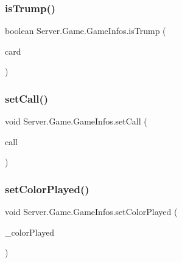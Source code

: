 \subsubsection{\texorpdfstring{is\+Trump()}{isTrump()}}
{\footnotesize\ttfamily boolean Server.\+Game.\+Game\+Infos.\+is\+Trump (\begin{DoxyParamCaption}\item[{\mbox{\hyperlink{classCommon_1_1Card}{Card}}}]{card }\end{DoxyParamCaption})\hspace{0.3cm}{\ttfamily [inline]}}

\mbox{\label{classServer_1_1Game_1_1GameInfos_a6903057180e23ab4773aba9a23af6a31}} 
\subsubsection{\texorpdfstring{set\+Call()}{setCall()}}
{\footnotesize\ttfamily void Server.\+Game.\+Game\+Infos.\+set\+Call (\begin{DoxyParamCaption}\item[{\mbox{\hyperlink{classCommon_1_1PlayerCallResponse}{Player\+Call\+Response}}}]{call }\end{DoxyParamCaption})\hspace{0.3cm}{\ttfamily [inline]}}

\mbox{\label{classServer_1_1Game_1_1GameInfos_abd39ccfe5a7b2710dba08bc67fbcb421}} 
\subsubsection{\texorpdfstring{set\+Color\+Played()}{setColorPlayed()}}
{\footnotesize\ttfamily void Server.\+Game.\+Game\+Infos.\+set\+Color\+Played (\begin{DoxyParamCaption}\item[{\mbox{\hyperlink{enumCommon_1_1Color}{Color}}}]{\+\_\+color\+Played }\end{DoxyParamCaption})\hspace{0.3cm}{\ttfamily [inline]}}

